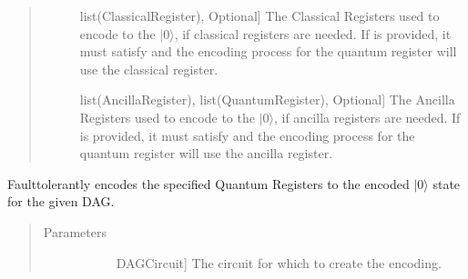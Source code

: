 \documentclass[letterpaper,10pt,english]{sphinxmanual}
\begin{document}
\begin{fulllineitems}
\begin{fulllineitems}
\begin{quote}
\begin{description}
\begin{description}
\item[{}] \leavevmode{[}list(ClassicalRegister), Optional{]}
\sphinxAtStartPar
The Classical Registers used to encode to the \(|0\rangle\), if classical registers are needed. If  is provided, it must satisfy  and the encoding process for the  quantum register will use the  classical register.

\item[{}] \leavevmode{[}list(AncillaRegister), list(QuantumRegister), Optional{]}
\sphinxAtStartPar
The Ancilla Registers used to encode to the \(|0\rangle\), if ancilla registers are needed. If  is provided, it must satisfy  and the encoding process for the  quantum register will use the  ancilla register.

\end{description}

\end{description}\end{quote}

\end{fulllineitems}


\begin{fulllineitems}
\label{\detokenize{Steane:Steane.SteaneFaultTolerantEncoder.getEncoderDag}}
\sphinxAtStartPar
Fault\sphinxhyphen{}tolerantly encodes the specified Quantum Registers to the encoded \(|0\rangle\) state for the given DAG.
\begin{quote}\begin{description}
\item[{Parameters}] \leavevmode\begin{description}
\item[{}] \leavevmode{[}DAGCircuit{]}
\sphinxAtStartPar
The circuit for which to create the encoding.


\end{description}
\end{description}
\end{quote}
\end{fulllineitems}
\end{fulllineitems}
\end{document}
